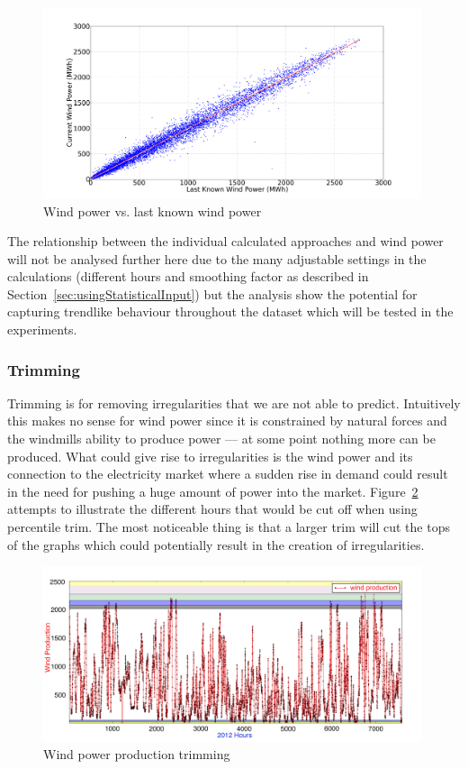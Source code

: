 \begin{figure}[H]
\centering
\includegraphics[width=0.99\textwidth]{billeder/windProductionVsLastWindProduction.png}
\caption{Wind power vs. last known wind power}
\label{fig:windProductionVsLastWindProduction}
\end{figure}

\noindent The relationship between the individual calculated approaches and wind power will not be analysed further here due to the many adjustable settings in the calculations (different hours and smoothing factor as described in Section~\ref{sec:usingStatisticalInput}) but the analysis show the potential for capturing trendlike behaviour throughout the dataset which will be tested in the experiments.

\subsubsection{Trimming} 
Trimming is for removing irregularities that we are not able to predict. Intuitively this makes no sense for wind power since it is constrained by natural forces and the windmills ability to produce power --- at some point nothing more can be produced. What could give rise to irregularities is the wind power and its connection to the electricity market where a sudden rise in demand could result in the need for pushing a huge amount of power into the market. Figure~\ref{fig:windProductionTrimming} attempts to illustrate the different hours that would be cut off when using percentile trim. The most noticeable thing is that a larger trim will cut the tops of the graphs which could potentially result in the creation of irregularities. 

\begin{figure}[H]
\centering
\includegraphics[width=0.99\textwidth]{billeder/windProductionTrimming.jpg}
\caption{Wind power production trimming}
\label{fig:windProductionTrimming}
\end{figure}

